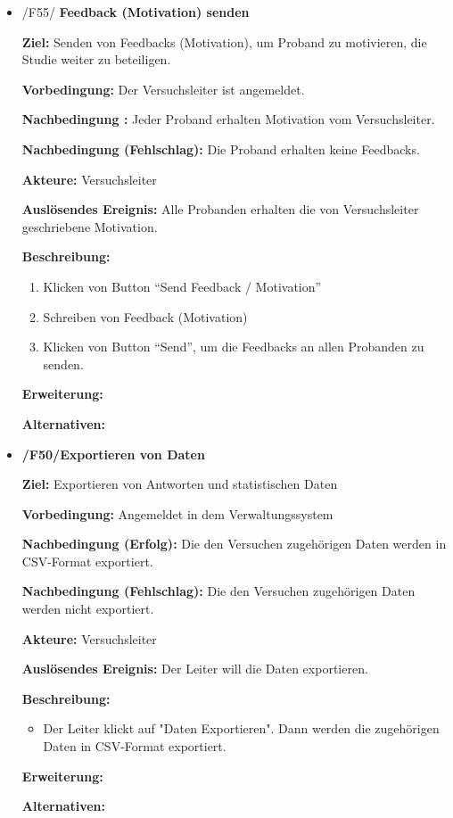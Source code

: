 \documentclass[a4paper]{scrreprt}
\begin{document}
\begin{itemize}
                \item /F55/ \textbf{Feedback (Motivation) senden}
                \par \textbf{Ziel: }Senden von Feedbacks (Motivation), um Proband zu motivieren, die Studie weiter zu beteiligen.
                \par \textbf{Vorbedingung: }Der Versuchsleiter ist angemeldet.
                \par \textbf{Nachbedingung : }Jeder Proband erhalten Motivation vom Versuchsleiter.
                \par \textbf{Nachbedingung (Fehlschlag): }Die Proband erhalten keine Feedbacks.
                \par \textbf{Akteure: }Versuchsleiter
                \par \textbf{Auslösendes Ereignis: }Alle Probanden erhalten die von Versuchsleiter geschriebene Motivation.
                \par \textbf{Beschreibung: }
                \begin{enumerate}
                    \item Klicken von Button ``Send Feedback / Motivation''
                    \item Schreiben von Feedback (Motivation)
                    \item Klicken von Button ``Send'', um die Feedbacks an allen Probanden zu senden.
                \end{enumerate}
                \par \textbf{Erweiterung: }
                \par \textbf{Alternativen: }

                \item \textbf{/F50/Exportieren von Daten}

                \par \textbf{Ziel: }Exportieren von Antworten und statistischen Daten
                \par \textbf{Vorbedingung: }Angemeldet in dem Verwaltungssystem
                \par \textbf{Nachbedingung (Erfolg): }Die den Versuchen zugehörigen Daten werden in CSV-Format exportiert.
                \par \textbf{Nachbedingung (Fehlschlag): }Die den Versuchen zugehörigen Daten werden nicht exportiert.
                \par \textbf{Akteure: }Versuchsleiter
                \par \textbf{Auslösendes Ereignis: }Der Leiter will die Daten exportieren.
                \par \textbf{Beschreibung: }
                \begin{itemize}
                    \item Der Leiter klickt auf "Daten Exportieren". Dann werden die zugehörigen Daten in CSV-Format exportiert.
                \end{itemize}
                \par \textbf{Erweiterung: }
                \par \textbf{Alternativen: }
            \end{itemize}
\end{document}
